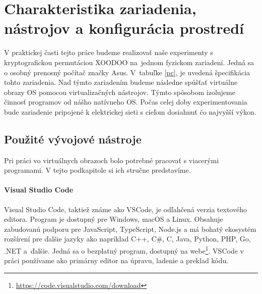 \chapter{Charakteristika zariadenia, nástrojov a konfigurácia prostredí}
V praktickej časti tejto práce budeme realizovať naše experimenty s kryptografickou permutáciou XOODOO na~jednom fyzickom zariadení. Jedná sa o osobný prenosný počítač značky Asus. V~tabuľke \ref{pc}, je uvedená špecifikácia tohto zariadenia. Nad týmto zariadením budeme následne spúšťať virtuálne obrazy OS pomocou virtualizačných nástrojov. Týmto spôsobom izolujeme činnosť programov od nášho natívneho OS. Počas celej doby experimentovania bude zariadenie pripojené k elektrickej sieti s cieľom dosiahnuť čo najvyšší výkon.

\begin{table}[!h]
	\centering
	\caption{Technická špecifikácia použitého fyzického zariadenia}\label{pc}
\end{table}

\section{Použité vývojové nástroje}
Pri práci vo virtuálnych obrazoch bolo potrebné pracovať s viacerými programami. V tejto podkapitole si ich stručne predstavíme.  
\subsubsection{Visual Studio Code \cite{vsc}}
Visual Studio Code, taktiež známe ako VSCode, je odľahčená verzia textového editora. Program je dostupný pre Windows, macOS a Linux. Obsahuje zabudovanú podporu pre JavaScript, TypeScript, Node.js a má bohatý ekosystém rozšírení pre ďalšie jazyky ako napríklad C++, C\#, C, Java, Python, PHP, Go, .NET a~ďalšie. Jedná sa o bezplatný program, dostupný na webe\footnote{\url{https://code.visualstudio.com/download}}. VSCode v práci používame ako primárny editor na úpravu, ladenie a preklad kódu.   
